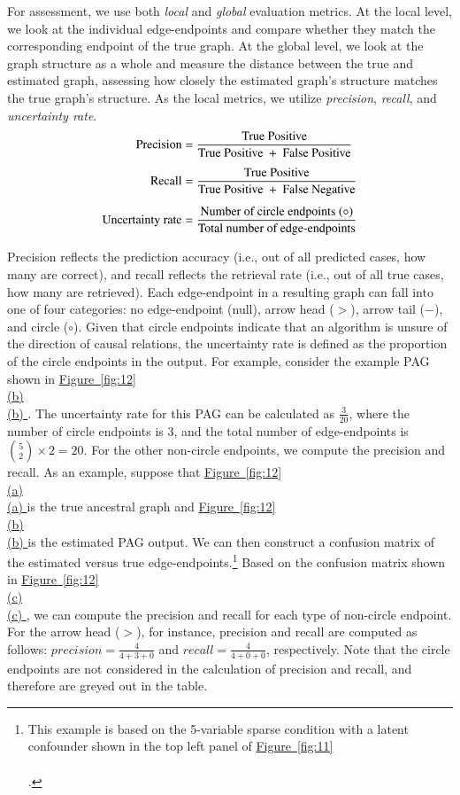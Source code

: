 \documentclass[twoside, 11pt]{article}
\newcommand*{\figref}[2][]{%
  \hyperref[{fig:#2}]{%
    Figure~\ref*{fig:#2}%
    \ifx\\#1\\%
    \else
      #1%
    \fi
  }%
}
\begin{document}
For assessment, we use both \textit{local} and \textit{global} evaluation metrics. At the local level, we look at the individual edge-endpoints and compare whether they match the corresponding endpoint of the true graph. At the global level, we look at the graph structure as a whole and measure the distance between the true and estimated graph, assessing how closely the estimated graph's structure matches the true graph's structure. As the local metrics, we utilize \textit{precision}, \textit{recall}, and \textit{uncertainty rate}.
\begin{align*}
\text{Precision} &= \frac{\text{True Positive}}{\text{True Positive } + \text{ False Positive}} \vspace{1mm} \\[1.1ex]
\text{Recall} &= \frac{\text{True Positive}}{\text{True Positive } + \text{ False Negative}} \\[1.1ex]
\text{Uncertainty rate} &= \frac{\text{Number of circle endpoints } (\circ)}{\text{Total number of edge-endpoints}}
\end{align*}

\noindent Precision reflects the prediction accuracy (i.e., out of all predicted cases, how many are correct), and recall reflects the retrieval rate (i.e., out of all true cases, how many are retrieved). Each edge-endpoint in a resulting graph can fall into one of four categories: no edge-endpoint (null), arrow head ($>$), arrow tail ($-$), and circle ($\circ$). Given that circle endpoints indicate that an algorithm is unsure of the direction of causal relations, the uncertainty rate is defined as the proportion of the circle endpoints in the output. 
For example, consider the example PAG shown in \figref[(b)]{12}.
The uncertainty rate for this PAG can be calculated as $\frac{3}{20}$, where the number of circle endpoints is 3, and the total number of edge-endpoints is $ \binom{5}{2} \times 2 = 20$.
For the other non-circle endpoints, we compute the precision and recall. As an example, suppose that \figref[(a)]{12} is the true ancestral graph and \figref[(b)]{12} is the estimated PAG output. We can then construct a confusion matrix of the estimated versus true edge-endpoints.\footnote{This example is based on the 5-variable sparse condition with a latent confounder shown in the top left panel of \figref[]{11}.} Based on the confusion matrix shown in \figref[(c)]{12}, we can compute the precision and recall for each type of non-circle endpoint. For the arrow head ($>$), for instance, precision and recall are computed as follows: $precision =  \frac{4}{4 + 3 + 0}$ and $recall = \frac{4}{4 + 0 + 0}$, respectively. Note that the circle endpoints are not considered in the calculation of precision and recall, and therefore are greyed out in the table.
\end{document}
